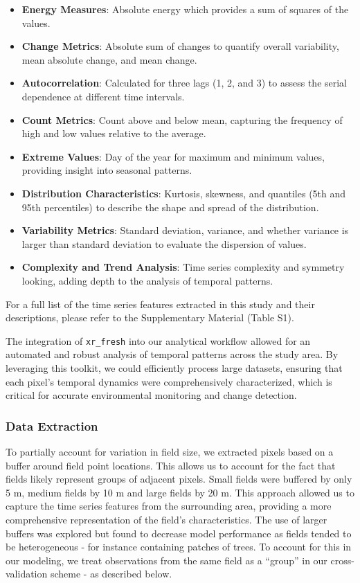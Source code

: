 \documentclass[
  journal,
  twocolumn]{IEEEtran}
\providecommand{\tightlist}{%
  \setlength{\itemsep}{0pt}\setlength{\parskip}{0pt}}
\begin{document}
\begin{itemize}
\tightlist
\item
  \textbf{Energy Measures}: Absolute energy which provides a sum of
  squares of the values.
\item
  \textbf{Change Metrics}: Absolute sum of changes to quantify overall
  variability, mean absolute change, and mean change.
\item
  \textbf{Autocorrelation}: Calculated for three lags (1, 2, and 3) to
  assess the serial dependence at different time intervals.
\item
  \textbf{Count Metrics}: Count above and below mean, capturing the
  frequency of high and low values relative to the average.
\item
  \textbf{Extreme Values}: Day of the year for maximum and minimum
  values, providing insight into seasonal patterns.
\item
  \textbf{Distribution Characteristics}: Kurtosis, skewness, and
  quantiles (5th and 95th percentiles) to describe the shape and spread
  of the distribution.
\item
  \textbf{Variability Metrics}: Standard deviation, variance, and
  whether variance is larger than standard deviation to evaluate the
  dispersion of values.
\item
  \textbf{Complexity and Trend Analysis}: Time series complexity and
  symmetry looking, adding depth to the analysis of temporal patterns.
\end{itemize}

For a full list of the time series features extracted in this study and
their descriptions, please refer to the Supplementary Material (Table
S1).

The integration of \texttt{xr\_fresh} into our analytical workflow
allowed for an automated and robust analysis of temporal patterns across
the study area. By leveraging this toolkit, we could efficiently process
large datasets, ensuring that each pixel's temporal dynamics were
comprehensively characterized, which is critical for accurate
environmental monitoring and change detection.

\subsubsection{Data Extraction}\label{data-extraction}

To partially account for variation in field size, we extracted pixels
based on a buffer around field point locations. This allows us to
account for the fact that fields likely represent groups of adjacent
pixels. Small fields were buffered by only 5 m, medium fields by 10 m
and large fields by 20 m. This approach allowed us to capture the time
series features from the surrounding area, providing a more
comprehensive representation of the field's characteristics. The use of
larger buffers was explored but found to decrease model performance as
fields tended to be heterogeneous - for instance containing patches of
trees. To account for this in our modeling, we treat observations from
the same field as a ``group'' in our cross-validation scheme - as
described below.
\end{document}
